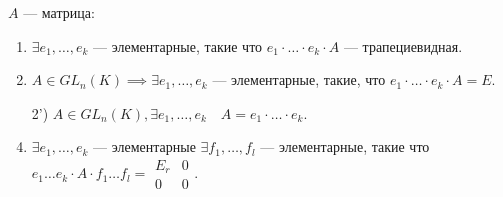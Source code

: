 \begin{theorem}
    $A$ --- матрица:
    \begin{enumerate}
        \item $\exists e_1, \ldots, e_k$ --- элементарные, такие что $e_1 \cdot \ldots \cdot e_k \cdot A$ --- трапециевидная.
        \item $A \in GL_n(K) \implies \exists e_1, \ldots, e_k$ --- элементарные, такие, что $e_1 \cdot \ldots \cdot e_k \cdot A = E$.
        \item[2')] $A \in GL_n(K), \exists e_1, \ldots, e_k \quad A=e_1 \cdot \ldots \cdot e_k$.
        \item $\exists e_1, \ldots, e_k$ --- элементарные $\exists f_1,\ldots, f_l$ --- элементарные, такие что $e_1 \ldots e_k \cdot A \cdot f_1 \ldots f_l = \begin{array}{|c|c|} E_r & 0 \\ \hline 0 & 0 \end{array}$.
    \end{enumerate}
\end{theorem}
